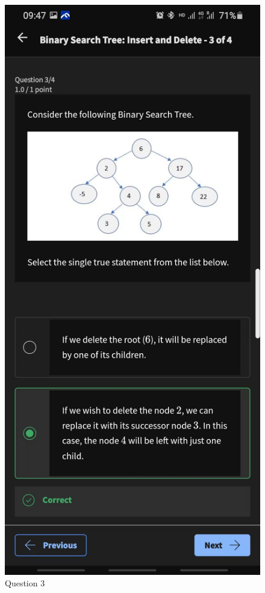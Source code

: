 \documentclass{article}
\begin{document}
\begin{figure}[ht]
    \includegraphics[width=\textwidth]{bstinsertiondeletionquiz3.jpg}
    \caption{Question 3}
\end{figure}
\end{document}
